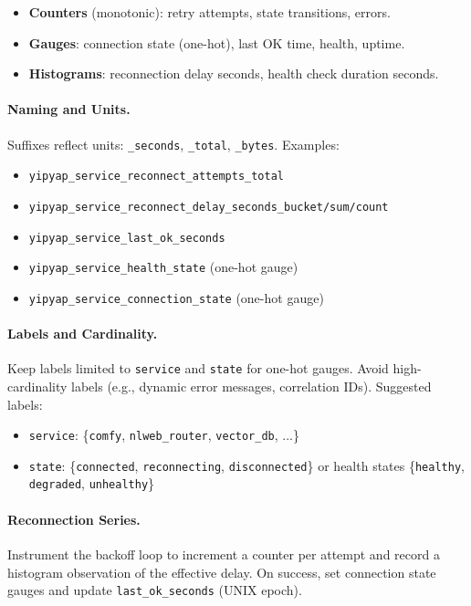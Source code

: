 \documentclass[11pt]{article}
\begin{document}
\begin{itemize}[nosep]
  \item \textbf{Counters} (monotonic): retry attempts, state transitions, errors.
  \item \textbf{Gauges}: connection state (one-hot), last OK time, health, uptime.
  \item \textbf{Histograms}: reconnection delay seconds, health check duration seconds.
\end{itemize}

\paragraph{Naming and Units.} Suffixes reflect units: \texttt{\_seconds}, \texttt{\_total}, \texttt{\_bytes}. Examples:
\begin{itemize}[nosep]
  \item \texttt{yipyap\_service\_reconnect\_attempts\_total}
  \item \texttt{yipyap\_service\_reconnect\_delay\_seconds\_bucket/sum/count}
  \item \texttt{yipyap\_service\_last\_ok\_seconds}
  \item \texttt{yipyap\_service\_health\_state} (one-hot gauge)
  \item \texttt{yipyap\_service\_connection\_state} (one-hot gauge)
\end{itemize}

\paragraph{Labels and Cardinality.} Keep labels limited to \texttt{service} and \texttt{state} for one-hot gauges. Avoid high-cardinality labels (e.g., dynamic error messages, correlation IDs). Suggested labels:
\begin{itemize}[nosep]
  \item \texttt{service}: \{\texttt{comfy}, \texttt{nlweb\_router}, \texttt{vector\_db}, ...\}
  \item \texttt{state}: \{\texttt{connected}, \texttt{reconnecting}, \texttt{disconnected}\} or health states \{\texttt{healthy}, \texttt{degraded}, \texttt{unhealthy}\}
\end{itemize}

\paragraph{Reconnection Series.} Instrument the backoff loop to increment a counter per attempt and record a histogram observation of the effective delay. On success, set connection state gauges and update \texttt{last\_ok\_seconds} (UNIX epoch).
\end{document}
